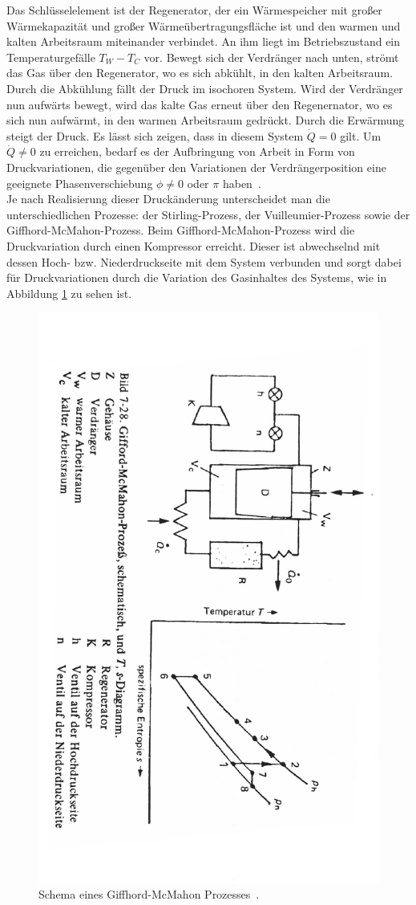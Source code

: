 \documentclass[parskip=half, a4paper,twoside,final]{article}
\begin{document}
Das Schlüsselelement ist der Regenerator, der ein Wärmespeicher mit großer Wärmekapazität und großer Wärmeübertragungsfläche ist und den warmen und kalten Arbeitsraum miteinander verbindet. An ihm liegt im Betriebszustand ein Temperaturgefälle $T_W - T_C$ vor. Bewegt sich der Verdränger nach unten, strömt das Gas über den Regenerator, wo es sich abkühlt, in den kalten Arbeitsraum. Durch die Abkühlung fällt der Druck im isochoren System. Wird der Verdränger nun aufwärts bewegt, wird das kalte Gas erneut über den Regenernator, wo es sich nun aufwärmt, in den warmen Arbeitsraum gedrückt. Durch die Erwärmung steigt der Druck. Es lässt sich zeigen, dass in diesem System $\dot{Q} = 0 $ gilt. Um $\dot{Q} \neq 0 $ zu erreichen, bedarf es der Aufbringung von Arbeit in Form von Druckvariationen, die gegenüber den Variationen der Verdrängerposition eine geeignete Phasenverschiebung $\phi \neq 0$ oder $\pi$ haben~\cite{Frey}. \\
Je nach Realisierung dieser Druckänderung unterscheidet man die unterschiedlichen Prozesse: der Stirling-Prozess, der Vuilleumier-Prozess sowie der Giffhord-McMahon-Prozess. Beim Giffhord-McMahon-Prozess wird die Druckvariation durch einen Kompressor erreicht. Dieser ist abwechselnd mit dessen Hoch- bzw. Niederdruckseite mit dem System verbunden und sorgt dabei für Druckvariationen durch die Variation des Gasinhaltes des Systems, wie in Abbildung \ref{fig:Giffhord-McMahon} zu sehen ist.

\begin{figure}[htp]
    \centering
        \includegraphics[height=0.9\textwidth, angle =90.7]{Bilder/McMahanMaschine.pdf}
    \caption{Schema eines Giffhord-McMahon Prozesses~\cite{Frey}.}
    \label{fig:Giffhord-McMahon}
\end{figure}
\end{document}
